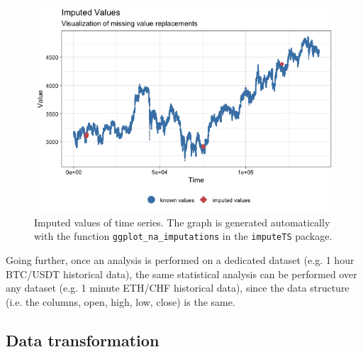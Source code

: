 \documentclass[twoside]{report}
\newcommand{\code}{\texttt}
\begin{document}
\begin{spacing}{1}
\begin{figure}[H]
    \centering
    \includegraphics[width=\linewidth]{Reddit_Analysis/Price_Data_Extraction/Data/Binance_OHLC/imputed_gg_1m.png}
    \caption{Imputed values of time series. The graph is generated automatically with the function \code{ggplot\_na\_imputations} in the \code{imputeTS} package.}
    \label{fig:imputations}
\end{figure}


Going further, once an analysis is performed on a dedicated dataset (e.g. 1 hour BTC/USDT historical data), the same statistical analysis can be performed over any dataset (e.g. 1 minute ETH/CHF historical data), since the data structure (i.e. the columns, open, high, low, close) is the same.



\subsection{Data transformation}


\end{spacing}
\end{document}
